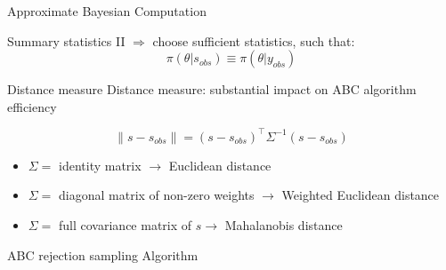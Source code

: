 \documentclass{beamer}
\begin{document}
\begin{section}{Approximate Bayesian Computation}
\begin{frame}{Summary statistics II}
		\vspace{0.3cm}
		$\Longrightarrow$ choose sufficient statistics, such that:
		\[   \pi(\theta|s_{obs}) \equiv \pi(\theta|y_{obs})   \]

	\end{frame}

	\begin{frame}{Distance measure}
		Distance measure: substantial impact on ABC algorithm efficiency
		
		\[  \parallel s - s_{obs} \parallel = (s - s_{obs})^\top \Sigma^{-1} (s - s_{obs}) \]
		
		\begin{itemize}
			\item $\Sigma = $ identity matrix $ \rightarrow$ Euclidean distance 
			\item $\Sigma =$ diagonal matrix of non-zero weights $ \rightarrow$ Weighted Euclidean distance 
			\item $\Sigma = $ full covariance matrix of $s \rightarrow$ Mahalanobis distance 
		\end{itemize}
	\end{frame}

	\begin{frame}{ABC rejection sampling Algorithm}


\end{frame}
\end{section}
\end{document}
